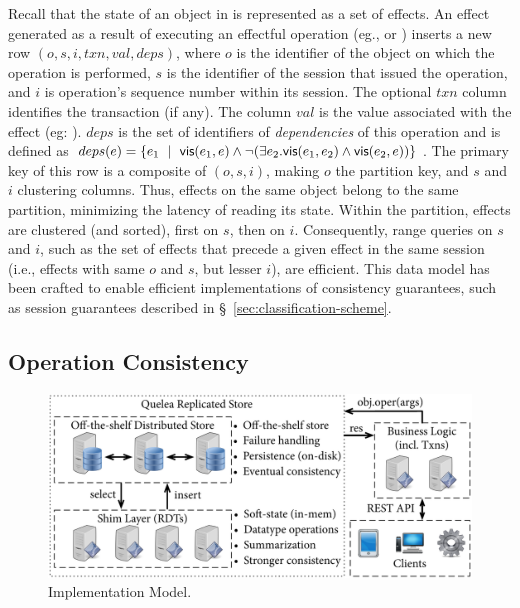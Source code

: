 Recall that the state of an object in \name is represented as a set of
effects. An effect generated as a result of executing an effectful
operation (eg., or ) inserts a new row
$(o,\allowbreak s,\allowbreak i, \allowbreak txn,\allowbreak val,
\allowbreak deps)$, where $o$ is the identifier of the object on which
the operation is performed, $s$ is the identifier of the session that
issued the operation, and $i$ is operation's sequence number within
its session. The optional $txn$ column identifies the transaction (if
any). The column $val$ is the value associated with the effect (eg:
).  $deps$ is the set of identifiers of
\emph{dependencies} of this operation and is defined as $deps(e) =
\{e_1 ~\mid~ {\normalfont \textsf{vis}(e_1,e)} \wedge \neg(\exists e_2.{\normalfont \textsf{vis}(e_1,e_2)} \wedge
{\normalfont \textsf{vis}(e_2,e)})\}$. The primary key of this row is a composite of
$(o,s,i)$, making $o$ the partition key, and $s$ and $i$ clustering
columns. Thus, effects on the same object belong to the same
partition, minimizing the latency of reading its state. Within the
partition, effects are clustered (and sorted), first on $s$, then on
$i$.  Consequently, range queries on $s$ and $i$, such as the set of
effects that precede a given effect in the same session (i.e., effects
with same $o$ and $s$, but lesser $i$), are efficient. This data model
has been crafted to enable efficient implementations of consistency
guarantees, such as session guarantees described in
\S~\ref{sec:classification-scheme}.

\subsection{Operation Consistency}

\begin{figure}
\begin{center}
\includegraphics[width=\columnwidth]{Figures/ImplModel}
\end{center}
\caption{Implementation Model.}
\label{fig:impl_mod}
\end{figure}

